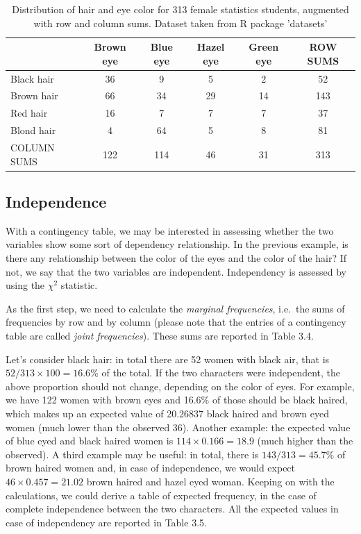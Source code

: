 \documentclass[a4paper,12pt,oneside]{book}
\begin{document}
\begin{table}

\caption{\label{tab:unnamed-chunk-6}Distribution of hair and eye color for 313 female statistics students, augmented with row and column sums. Dataset taken from R package 'datasets'}
\centering
\begin{tabular}[t]{lccccc}
\toprule
  & Brown eye & Blue eye & Hazel eye & Green eye & ROW SUMS\\
\midrule
Black hair & 36 & 9 & 5 & 2 & 52\\
Brown hair & 66 & 34 & 29 & 14 & 143\\
Red hair & 16 & 7 & 7 & 7 & 37\\
Blond hair & 4 & 64 & 5 & 8 & 81\\
COLUMN SUMS & 122 & 114 & 46 & 31 & 313\\
\bottomrule
\end{tabular}
\end{table}

\hypertarget{independence}{%
\subsection{Independence}\label{independence}}

With a contingency table, we may be interested in assessing whether the two variables show some sort of dependency relationship. In the previous example, is there any relationship between the color of the eyes and the color of the hair? If not, we say that the two variables are independent. Independency is assessed by using the \(\chi^2\) statistic.

As the first step, we need to calculate the \emph{marginal frequencies}, i.e.~the sums of frequencies by row and by column (please note that the entries of a contingency table are called \emph{joint frequencies}). These sums are reported in Table 3.4.

Let's consider black hair: in total there are 52 women with black air, that is \(52/313 \times 100 = 16.6\)\% of the total. If the two characters were independent, the above proportion should not change, depending on the color of eyes. For example, we have 122 women with brown eyes and 16.6\% of those should be black haired, which makes up an expected value of 20.26837 black haired and brown eyed women (much lower than the observed 36). Another example: the expected value of blue eyed and black haired women is \(114 \times 0.166 = 18.9\) (much higher than the observed). A third example may be useful: in total, there is \(143/313 = 45.7\)\% of brown haired women and, in case of independence, we would expect \(46 \times 0.457 = 21.02\) brown haired and hazel eyed woman. Keeping on with the calculations, we could derive a table of expected frequency, in the case of complete independence between the two characters. All the expected values in case of independency are reported in Table 3.5.
\end{document}
